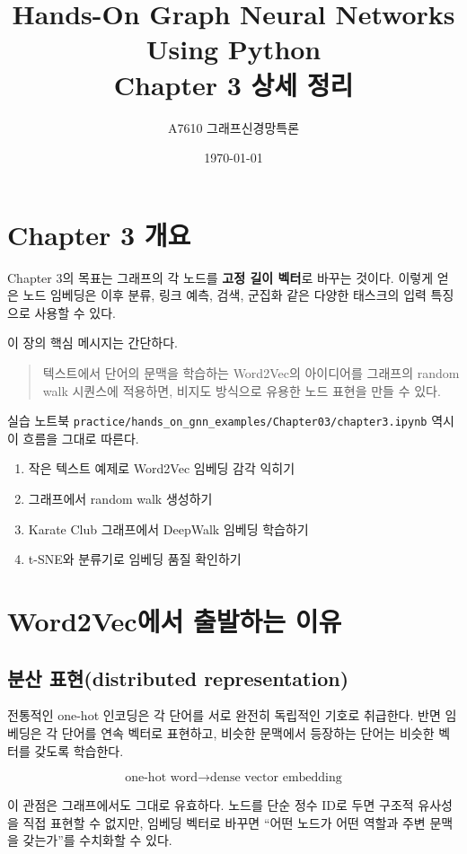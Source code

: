 \documentclass[11pt,a4paper]{article}
\title{Hands-On Graph Neural Networks Using Python\\Chapter 3 상세 정리}
\author{A7610 그래프신경망특론}
\date{\today}
\begin{document}
\maketitle
\tableofcontents
\newpage

\section{Chapter 3 개요}

Chapter 3의 목표는 그래프의 각 노드를 \textbf{고정 길이 벡터}로 바꾸는 것이다. 이렇게 얻은 노드 임베딩은 이후 분류, 링크 예측, 검색, 군집화 같은 다양한 태스크의 입력 특징으로 사용할 수 있다.

이 장의 핵심 메시지는 간단하다.
\begin{quote}
텍스트에서 단어의 문맥을 학습하는 Word2Vec의 아이디어를 그래프의 random walk 시퀀스에 적용하면, 비지도 방식으로 유용한 노드 표현을 만들 수 있다.
\end{quote}

실습 노트북 \texttt{practice/hands\_on\_gnn\_examples/Chapter03/chapter3.ipynb} 역시 이 흐름을 그대로 따른다.
\begin{enumerate}[leftmargin=*]
  \item 작은 텍스트 예제로 Word2Vec 임베딩 감각 익히기
  \item 그래프에서 random walk 생성하기
  \item Karate Club 그래프에서 DeepWalk 임베딩 학습하기
  \item t-SNE와 분류기로 임베딩 품질 확인하기
\end{enumerate}

\section{Word2Vec에서 출발하는 이유}

\subsection{분산 표현(distributed representation)}
전통적인 one-hot 인코딩은 각 단어를 서로 완전히 독립적인 기호로 취급한다. 반면 임베딩은 각 단어를 연속 벡터로 표현하고, 비슷한 문맥에서 등장하는 단어는 비슷한 벡터를 갖도록 학습한다.

\[
\text{one-hot word} \rightarrow \text{dense vector embedding}
\]

이 관점은 그래프에서도 그대로 유효하다. 노드를 단순 정수 ID로 두면 구조적 유사성을 직접 표현할 수 없지만, 임베딩 벡터로 바꾸면 ``어떤 노드가 어떤 역할과 주변 문맥을 갖는가''를 수치화할 수 있다.
\end{document}
